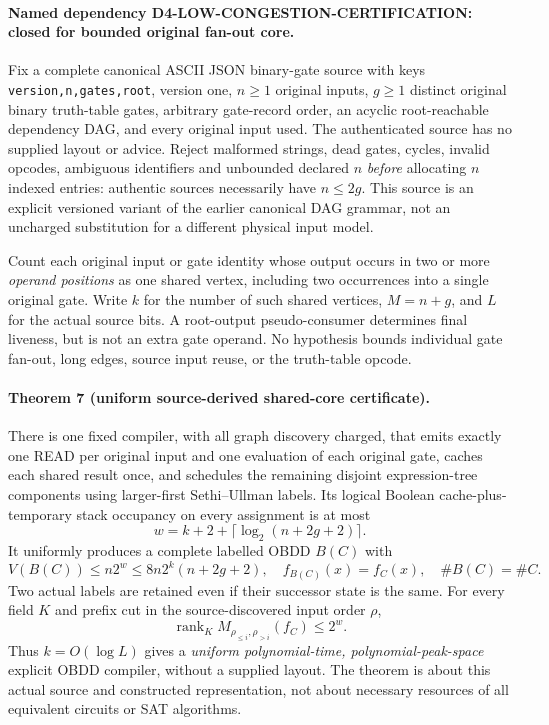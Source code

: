 \documentclass[11pt]{article}
\begin{document}
\paragraph{Named dependency D4-LOW-CONGESTION-CERTIFICATION: closed for bounded original fan-out core.}
Fix a complete canonical ASCII JSON binary-gate source with keys
\texttt{version,n,gates,root}, version one, $n\geq1$ original inputs,
$g\geq1$ distinct original binary truth-table gates, arbitrary gate-record
order, an acyclic root-reachable dependency DAG, and every original input used.
The authenticated source has no supplied layout or advice. Reject malformed
strings, dead gates, cycles, invalid opcodes, ambiguous identifiers and
unbounded declared $n$ \emph{before} allocating $n$ indexed entries:
authentic sources necessarily have $n\leq2g$. This source is an explicit
versioned variant of the earlier canonical DAG grammar, not an uncharged
substitution for a different physical input model.

Count each original input or gate identity whose output occurs in
two or more \emph{operand positions} as one shared vertex, including
two occurrences into a single original gate. Write $k$ for the number
of such shared vertices, $M=n+g$, and $L$ for the actual source bits.
A root-output pseudo-consumer determines final liveness, but is not
an extra gate operand. No hypothesis bounds individual gate fan-out,
long edges, source input reuse, or the truth-table opcode.

\paragraph{Theorem 7 (uniform source-derived shared-core certificate).}
There is one fixed compiler, with all graph discovery charged, that
emits exactly one READ per original input and one evaluation of
each original gate, caches each shared result once, and schedules
the remaining disjoint expression-tree components using larger-first
Sethi--Ullman labels. Its logical Boolean cache-plus-temporary
stack occupancy on every assignment is at most
\[
w=k+2+\lceil\log_2(n+2g+2)\rceil.
\]
It uniformly produces a complete labelled OBDD $B(C)$ with
\[
 V(B(C))\le n2^w\le8n2^k(n+2g+2),
 \quad f_{B(C)}(x)=f_C(x),\quad \#B(C)=\#C.
\]
Two actual labels are retained even if their successor state is
the same. For every field $K$ and prefix cut in the source-discovered
input order $\rho$,
\[
 \operatorname{rank}_K M_{\rho_{\le i},\rho_{>i}}(f_C)
 \le 2^w.
\]
Thus $k=O(\log L)$ gives a \emph{uniform polynomial-time,
polynomial-peak-space} explicit OBDD compiler, without a supplied
layout. The theorem is about this actual source and constructed
representation, not about necessary resources of all equivalent
circuits or SAT algorithms.
\end{document}
